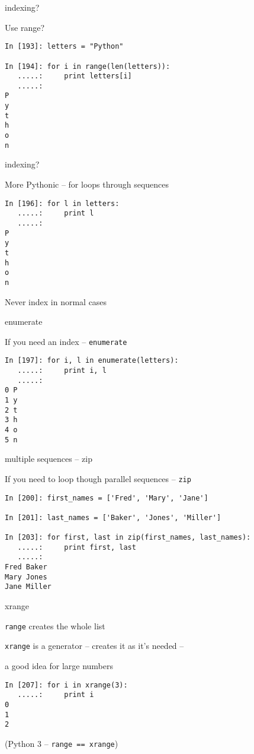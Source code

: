 \documentclass{beamer}
\begin{document}
\begin{frame}[fragile]{indexing?}

{\Large Use range?}
\begin{verbatim}
In [193]: letters = "Python"

In [194]: for i in range(len(letters)):
   .....:     print letters[i]
   .....:     
P
y
t
h
o
n
\end{verbatim}

\end{frame}

\begin{frame}[fragile]{indexing?}

{\Large More Pythonic -- for loops through sequences}
\begin{verbatim}
In [196]: for l in letters:
   .....:     print l
   .....:     
P
y
t
h
o
n
\end{verbatim}
\vfill
{\large Never index in normal cases}
\end{frame}

\begin{frame}[fragile]{enumerate}

{\Large If you need an index -- \verb|enumerate|}
\begin{verbatim}
In [197]: for i, l in enumerate(letters):
   .....:     print i, l
   .....:     
0 P
1 y
2 t
3 h
4 o
5 n
\end{verbatim}
\end{frame}

\begin{frame}[fragile]{multiple sequences -- zip}

{\Large If you need to loop though parallel sequences -- \verb|zip|}
\begin{verbatim}
In [200]: first_names = ['Fred', 'Mary', 'Jane']

In [201]: last_names = ['Baker', 'Jones', 'Miller']

In [203]: for first, last in zip(first_names, last_names):
   .....:     print first, last
   .....:     
Fred Baker
Mary Jones
Jane Miller
\end{verbatim}
\end{frame}

\begin{frame}[fragile]{xrange}

{\Large \verb|range| creates the whole list}

\vfill
{\Large \verb|xrange| is a generator -- creates it as it's needed --}

\vfill
{\Large a good idea for large numbers}

\begin{verbatim}
In [207]: for i in xrange(3):
   .....:     print i
0
1
2
\end{verbatim}
(Python 3 -- \verb|range == xrange|)
\end{frame}
\end{document}
